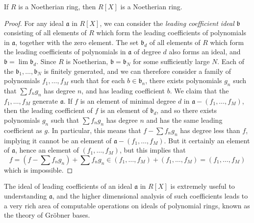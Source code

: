 \begin{theorem}
    If $R$ is a Noetherian ring, then $R[X]$ is a Noetherian ring.
\end{theorem}
\begin{proof}
    For any ideal $\mathfrak{a}$ in $R[X]$, we can consider the {\it leading coefficient ideal} $\mathfrak{b}$ consisting of all elements of $R$ which form the leading coefficients of polynomials in $\mathfrak{a}$, together with the zero element. The set $\mathfrak{b}_d$ of all elements of $R$ which form the leading coefficients of polynomials in $\mathfrak{a}$ of degree $d$ also forms an ideal, and $\mathfrak{b} = \lim \mathfrak{b}_d$. Since $R$ is Noetherian, $\mathfrak{b} = \mathfrak{b}_N$ for some sufficiently large $N$. Each of the $\mathfrak{b}_1, \dots, \mathfrak{b}_N$ is finitely generated, and we can therefore consider a family of polynomials $f_1, \dots, f_M$ such that for each $b \in \mathfrak{b}_n$, there exists polynomials $g_n$ such that $\sum f_n g_n$ has degree $n$, and has leading coefficient $b$. We claim that the $f_1, \dots, f_M$ generate $\mathfrak{a}$. If $f$ is an element of minimal degree $d$ in $\mathfrak{a} - (f_1, \dots, f_M)$, then the leading coefficient of $f$ is an element of $\mathfrak{b}_d$, and so there exists polynomials $g_n$ such that $\sum f_n g_n$ has degree $n$ and has the same leading coefficient as $g$. In particular, this means that $f - \sum f_n g_n$ has degree less than $f$, implying it cannot be an element of $\mathfrak{a} - (f_1, \dots, f_M)$. But it certainly an element of $\mathfrak{a}$, hence an element of $(f_1, \dots, f_M)$, but this implies that
    \[ f = (f - \sum f_n g_n) + \sum f_n g_n \in (f_1, \dots, f_M) + (f_1, \dots, f_M) = (f_1, \dots, f_M) \]
    which is impossible.
\end{proof}

The ideal of leading coefficients of an ideal $\mathfrak{a}$ in $R[X]$ is extremely useful to understanding $\mathfrak{a}$, and the higher dimensional analysis of such coefficients leads to a very rich area of computable operations on ideals of polynomial rings, known as the theory of Gr\"{o}bner bases.

